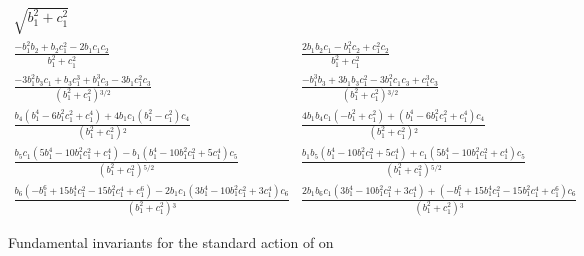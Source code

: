 \begin{table}
\label{tab:SO2n6}
\[
\begin{array}{ll}
  \sqrt{b_1^2+c_1^2} & \\
 \frac{-b_1^2 b_2+b_2 c_1^2-2 b_1 c_1 c_2}{b_1^2+c_1^2} & \frac{2 b_1 b_2 c_1-b_1^2 c_2+c_1^2 c_2}{b_1^2+c_1^2} \\
 \frac{-3 b_1^2 b_3 c_1+b_3 c_1^3+b_1^3 c_3-3 b_1 c_1^2 c_3}{\left(b_1^2+c_1^2\right){}^{3/2}} & \frac{-b_1^3 b_3+3 b_1 b_3 c_1^2-3 b_1^2 c_1 c_3+c_1^3
c_3}{\left(b_1^2+c_1^2\right){}^{3/2}} \\
 \frac{b_4 \left(b_1^4-6 b_1^2 c_1^2+c_1^4\right)+4 b_1 c_1 \left(b_1^2-c_1^2\right) c_4}{\left(b_1^2+c_1^2\right){}^2} & \frac{4 b_1 b_4 c_1 \left(-b_1^2+c_1^2\right)+\left(b_1^4-6
b_1^2 c_1^2+c_1^4\right) c_4}{\left(b_1^2+c_1^2\right){}^2} \\
 \frac{b_5 c_1 \left(5 b_1^4-10 b_1^2 c_1^2+c_1^4\right)-b_1 \left(b_1^4-10 b_1^2 c_1^2+5 c_1^4\right) c_5}{\left(b_1^2+c_1^2\right){}^{5/2}} & \frac{b_1
b_5 \left(b_1^4-10 b_1^2 c_1^2+5 c_1^4\right)+c_1 \left(5 b_1^4-10 b_1^2 c_1^2+c_1^4\right) c_5}{\left(b_1^2+c_1^2\right){}^{5/2}} \\
 \frac{b_6 \left(-b_1^6+15 b_1^4 c_1^2-15 b_1^2 c_1^4+c_1^6\right)-2 b_1 c_1 \left(3 b_1^4-10 b_1^2 c_1^2+3 c_1^4\right) c_6}{\left(b_1^2+c_1^2\right){}^3}
& \frac{2 b_1 b_6 c_1 \left(3 b_1^4-10 b_1^2 c_1^2+3 c_1^4\right)+\left(-b_1^6+15 b_1^4 c_1^2-15 b_1^2 c_1^4+c_1^6\right) c_6}{\left(b_1^2+c_1^2\right){}^3}
\end{array}
\]
\caption[Fundametal invariants for SO(2), n=6.]{Fundamental invariants for the standard action of  on }
\end{table}



